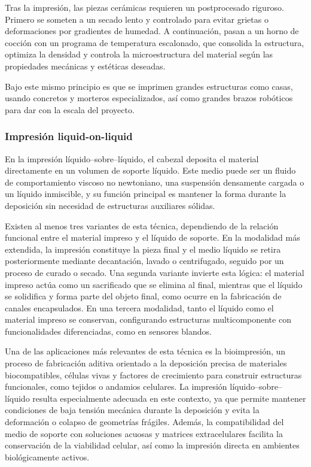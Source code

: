 Tras la impresión, las piezas cerámicas requieren un postprocesado riguroso. Primero se someten a un secado lento y controlado para evitar grietas o deformaciones por gradientes de humedad. A continuación, pasan a un horno de cocción con un programa de temperatura escalonado, que consolida la estructura, optimiza la densidad y controla la microestructura del material según las propiedades mecánicas y estéticas deseadas.

Bajo este mismo principio es que se imprimen grandes estructuras como casas, usando concretos y morteros especializados, así como grandes brazos robóticos para dar con la escala del proyecto.

\subsubsection{Impresión liquid-on-liquid}

En la impresión líquido–sobre–líquido, el cabezal deposita el material directamente en un volumen de soporte líquido. Este medio puede ser un fluido de comportamiento viscoso no newtoniano, una suspensión densamente cargada o un líquido inmiscible, y su función principal es mantener la forma durante la deposición sin necesidad de estructuras auxiliares sólidas.

Existen al menos tres variantes de esta técnica, dependiendo de la relación funcional entre el material impreso y el líquido de soporte. En la modalidad más extendida, la impresión constituye la pieza final y el medio líquido se retira posteriormente mediante decantación, lavado o centrifugado, seguido por un proceso de curado o secado. Una segunda variante invierte esta lógica: el material impreso actúa como un sacrificado que se elimina al final, mientras que el líquido se solidifica y forma parte del objeto final, como ocurre en la fabricación de canales encapsulados. En una tercera modalidad, tanto el líquido como el material impreso se conservan, configurando estructuras multicomponente con funcionalidades diferenciadas, como en sensores blandos.

Una de las aplicaciones más relevantes de esta técnica es la bioimpresión, un proceso de fabricación aditiva orientado a la deposición precisa de materiales biocompatibles, células vivas y factores de crecimiento para construir estructuras funcionales, como tejidos o andamios celulares. La impresión líquido–sobre–líquido resulta especialmente adecuada en este contexto, ya que permite mantener condiciones de baja tensión mecánica durante la deposición y evita la deformación o colapso de geometrías frágiles. Además, la compatibilidad del medio de soporte con soluciones acuosas y matrices extracelulares facilita la conservación de la viabilidad celular, así como la impresión directa en ambientes biológicamente activos.

